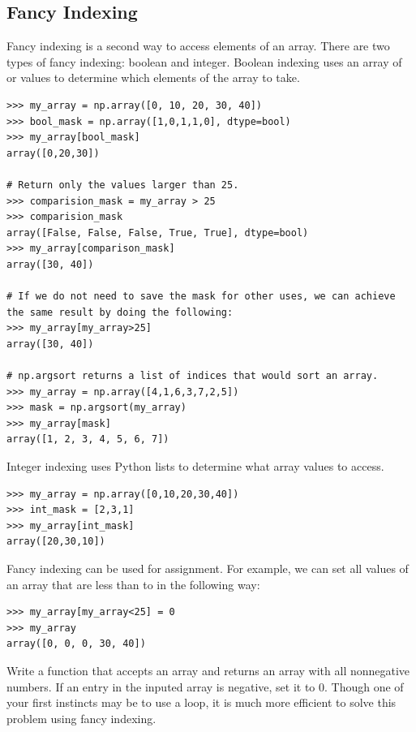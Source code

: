 \subsection*{Fancy Indexing}
Fancy indexing is a second way to access elements of an array. 
There are two types of fancy indexing: boolean and integer. 
Boolean indexing uses an array of  or  values to 
determine which elements of the array to take. 

\begin{lstlisting}
>>> my_array = np.array([0, 10, 20, 30, 40])
>>> bool_mask = np.array([1,0,1,1,0], dtype=bool)
>>> my_array[bool_mask]
array([0,20,30])

# Return only the values larger than 25.
>>> comparision_mask = my_array > 25
>>> comparision_mask
array([False, False, False, True, True], dtype=bool)
>>> my_array[comparison_mask]
array([30, 40])

# If we do not need to save the mask for other uses, we can achieve the same result by doing the following:
>>> my_array[my_array>25]
array([30, 40])

# np.argsort returns a list of indices that would sort an array.
>>> my_array = np.array([4,1,6,3,7,2,5])
>>> mask = np.argsort(my_array)
>>> my_array[mask]
array([1, 2, 3, 4, 5, 6, 7])
\end{lstlisting}

Integer indexing uses Python lists to determine what array values to access.
\begin{lstlisting}
>>> my_array = np.array([0,10,20,30,40])
>>> int_mask = [2,3,1]
>>> my_array[int_mask]
array([20,30,10])
\end{lstlisting}

Fancy indexing can
be used for assignment. For example, we can set all values of an array
that are less than  to  in the following way:
\begin{lstlisting} 
>>> my_array[my_array<25] = 0
>>> my_array
array([0, 0, 0, 30, 40])
\end{lstlisting}

\begin{problem}
Write a function that accepts an array and returns an array with all nonnegative numbers. If an entry in the inputed array is negative, set it to $0$. Though one of your first instincts may be to use a  loop, it is much more efficient to solve this problem using fancy indexing.
\end{problem}

